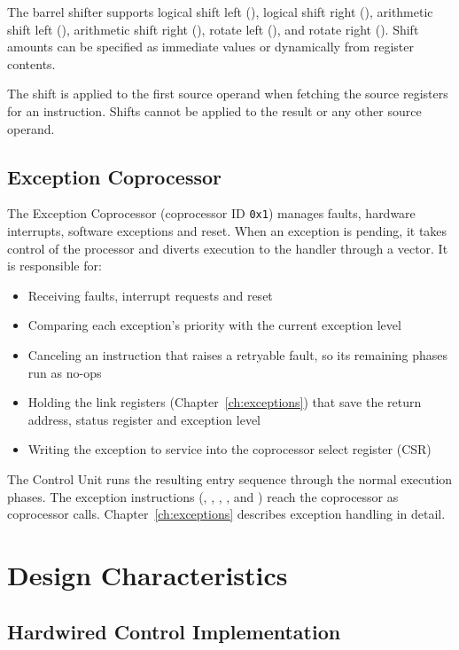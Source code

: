 The barrel shifter supports logical shift left (), logical shift right (), arithmetic shift
left (), arithmetic shift right (), rotate left (), and rotate right
(). Shift amounts can be specified as immediate values or dynamically from register contents.

The shift is applied to the first source operand when fetching the source registers for an instruction. Shifts cannot
be applied to the result or any other source operand.

\subsection{Exception Coprocessor}

The Exception Coprocessor (coprocessor ID \texttt{0x1}) manages faults, hardware interrupts, software exceptions and
reset. When an exception is pending, it takes control of the processor and diverts execution to the handler through a
vector. It is responsible for:

\begin{itemize}
	\item Receiving faults, interrupt requests and reset
	\item Comparing each exception's priority with the current exception level
	\item Canceling an instruction that raises a retryable fault, so its remaining phases run as no-ops
	\item Holding the link registers (Chapter~\ref{ch:exceptions}) that save the return address, status register and exception
	      level
	\item Writing the exception to service into the coprocessor select register (CSR)
\end{itemize}

The Control Unit runs the resulting entry sequence through the normal execution phases. The exception instructions
(, , , ,  and ) reach the
coprocessor as coprocessor calls. Chapter~\ref{ch:exceptions} describes exception handling in detail.

\section{Design Characteristics}

\subsection{Hardwired Control Implementation}

